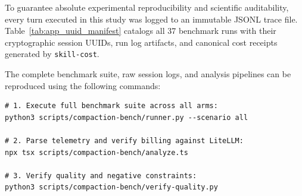 \documentclass[10pt,twocolumn,a4paper]{article}
\begin{document}
To guarantee absolute experimental reproducibility and scientific auditability, every turn executed in this study was logged to an immutable JSONL trace file. Table~\ref{tab:app_uuid_manifest} catalogs all 37 benchmark runs with their cryptographic session UUIDs, run log artifacts, and canonical cost receipts generated by \texttt{skill-cost}.

The complete benchmark suite, raw session logs, and analysis pipelines can be reproduced using the following commands:
\begin{scriptsize}
\begin{verbatim}
# 1. Execute full benchmark suite across all arms:
python3 scripts/compaction-bench/runner.py --scenario all

# 2. Parse telemetry and verify billing against LiteLLM:
npx tsx scripts/compaction-bench/analyze.ts

# 3. Verify quality and negative constraints:
python3 scripts/compaction-bench/verify-quality.py
\end{verbatim}
\end{scriptsize}
\end{document}
